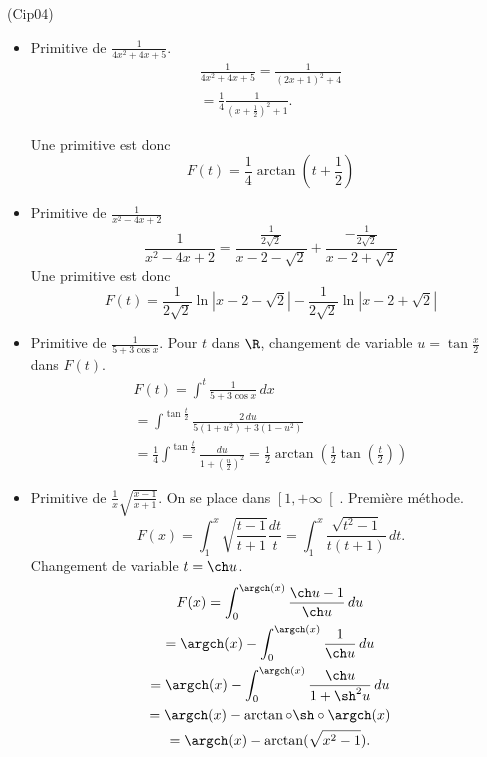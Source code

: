 \begin{tiny}(Cip04)\end{tiny}
\begin{itemize}
 \item Primitive de $\frac{1}{4x^2+4x+5}$. 
\begin{multline*}
 \frac{1}{4x^2+4x+5}=\frac{1}{(2x+1)^2+4} \\
 = \frac{1}{4}\frac{1}{(x+\frac{1}{2})^2+1}.
\end{multline*}

Une primitive est donc
\begin{displaymath}
 F(t) = \frac{1}{4}\arctan(t+\frac{1}{2})
\end{displaymath}

 \item Primitive de $\frac{1}{x^2-4x+2} $
\begin{displaymath}
 \frac{1}{x^2-4x+2} = \frac{\frac{1}{2\sqrt{2}}}{x-2-\sqrt{2}}+ \frac{-\frac{1}{2\sqrt{2}}}{x-2+\sqrt{2}}
\end{displaymath}
Une primitive est donc
\begin{displaymath}
 F(t)= \frac{1}{2\sqrt{2}} \ln|x-2-\sqrt{2}| - \frac{1}{2\sqrt{2}} \ln|x-2+\sqrt{2}|
\end{displaymath}

 \item Primitive de $\frac{1}{5+3\cos x}$.
Pour $t$ dans $\R$, changement de variable $u=\tan \frac{x}{2}$ dans $F(t)$.
\begin{multline*}
 F(t) = \int^t\frac{1}{5+3\cos x}\,dx\\
 = \int^{\tan \frac{t}{2}}\frac{2\,du}{5(1+u^2)+3(1-u^2)}\\
= \frac{1}{4}\int^{\tan \frac{t}{2}}\frac{du}{1+(\frac{u}{2})^2}
= \frac{1}{2}\arctan\left(\frac{1}{2}\tan(\frac{t}{2}) \right) 
\end{multline*}

 \item Primitive de $\frac{1}{x}\sqrt{\frac{x-1}{x+1}}$. On se place dans $\left[ 1, +\infty\right[$.\newline
Première méthode.
\[
 F(x) = \int_1^{x}\sqrt{\frac{t-1}{t+1}}\frac{dt}{t}
 = \int_1^{x}\frac{\sqrt{t^2-1}}{t(t+1)}\,dt.
\]
Changement de variable $t = \ch u$.
\begin{multline*}
 F(x) = \int_{0}^{\argch(x)}\frac{\ch u -1}{\ch u}\, du \\
 = \argch(x) - \int_{0}^{\argch(x)}\frac{1}{\ch u}\, du \\
 = \argch(x) - \int_{0}^{\argch(x)}\frac{\ch u}{1 + \sh^2 u}\, du \\
 = \argch(x) - \arctan \circ \sh \circ \argch (x)\\
 = \argch(x) - \arctan(\sqrt{x^2 - 1}).
\end{multline*}


\end{itemize}
